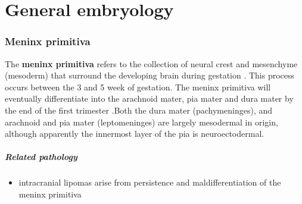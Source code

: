 \chapter{General embryology}

\subsection{Meninx primitiva}

The \textbf{meninx primitiva} refers to the collection of neural crest and mesenchyme (mesoderm) that surround the developing brain during gestation . This process occurs between the 3 and 5 week of gestation. The meninx primitiva will eventually differentiate into the arachnoid mater, pia mater and dura mater by the end of the first trimester .Both the dura mater (pachymeninges), and arachnoid and pia mater (leptomeninges) are largely mesodermal in origin, although apparently the innermost layer of the pia is neuroectodermal.

\paragraph{Related pathology}

\begin{itemize}
	\item
	intracranial lipomas arise from persistence and maldifferentiation of the meninx primitiva
\end{itemize}